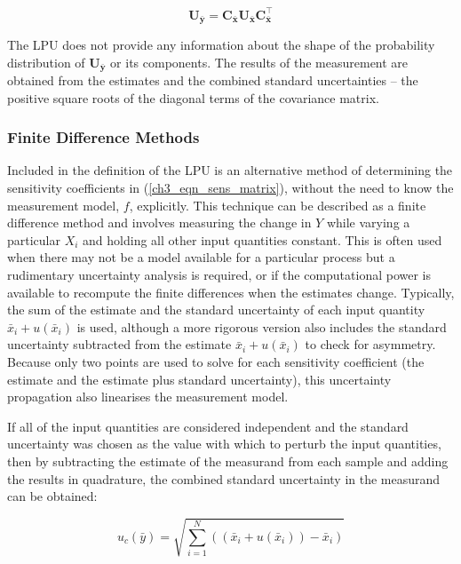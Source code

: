 \documentclass[../thesis/thesis.tex]{subfiles}
\begin{document}
\begin{refsection}
\begin{equation}
\boldsymbol U_{\bar{\boldsymbol y}} = \boldsymbol C_{\bar{\boldsymbol x}}\boldsymbol U_{\bar{\boldsymbol x}}\boldsymbol C_{\bar{\boldsymbol x}}^\top
\end{equation}

The LPU does not provide any information about the shape of the probability distribution of $\boldsymbol U_{\bar{\boldsymbol y}}$ or its components. The results of the measurement are obtained from the estimates and the combined standard uncertainties – the positive square roots of the diagonal terms of the covariance matrix.

\subsubsection{Finite Difference Methods} \label{ch3_sec_fd_methods}

Included in the definition of the LPU is an alternative method of determining the sensitivity coefficients in (\ref{ch3_eqn_sens_matrix}), without the need to know the measurement model, $f$, explicitly. This technique can be described as a finite difference method and involves measuring the change in $Y$ while varying a particular $X_i$ and holding all other input quantities constant. This is often used when there may not be a model available for a particular process but a rudimentary uncertainty analysis is required, or if the computational power is available to recompute the finite differences when the estimates change. Typically, the sum of the estimate and the standard uncertainty of each input quantity $\bar{x}_i + u(\bar{x}_i)$ is used, although a more rigorous version also includes the standard uncertainty subtracted from the estimate $\bar{x}_i + u(\bar{x}_i)$ to check for asymmetry. Because only two points are used to solve for each sensitivity coefficient (the estimate and the estimate plus standard uncertainty), this uncertainty propagation also linearises the measurement model.

If all of the input quantities are considered independent and the standard uncertainty was chosen as the value with which to perturb the input quantities, then by subtracting the estimate of the measurand from each sample and adding the results in quadrature, the combined standard uncertainty in the measurand can be obtained:

\begin{equation}
u_c(\bar{y}) = \sqrt{\sum_{i=1}^{N}((\bar{x}_i+u(\bar{x}_i))-\bar{x}_i)}
\end{equation}


\end{refsection}
\end{document}
